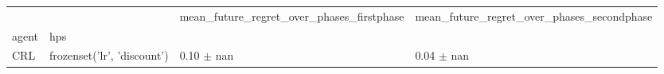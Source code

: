 \begin{tabular}{llll}
\toprule
 &  & mean_future_regret_over_phases_firstphase & mean_future_regret_over_phases_secondphase \\
agent & hps &  &  \\
\midrule
CRL & frozenset({'lr', 'discount'}) & 0.10 $\pm$ nan & 0.04 $\pm$ nan \\
\cline{1-4}
\bottomrule
\end{tabular}
